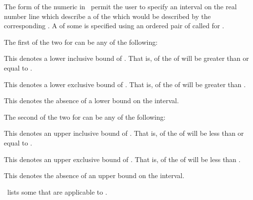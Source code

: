 \endsubsubsection%

\endsubsection%


The  form of the numeric 
in \thenextfigure\ permit the user to specify an interval on the real number line
which describe a  of the  which would be described by the
corresponding .  A  of some 
 is specified using an ordered pair of  called
 for  .

The first of the two  for   can be
any of the following:

\beginlist


This denotes a lower inclusive bound of .  That is, 
of the  of  will be greater than or equal to .


This denotes a lower exclusive bound of .  That is, 
of the  of  will be greater than .


This denotes the absence of a lower bound on the interval.

\endlist

The second of the two  for   can be
any of the following:

\beginlist


This denotes an upper inclusive bound of .  That is, 
of the  of  will be less than or equal to .


This denotes an upper exclusive bound of .  That is, 
of the  of  will be less than .


This denotes the absence of an upper bound on the interval.

\endlist

\endsubsection%


\Thenextfigure\ lists some  that are applicable to .


\endsubsection%
